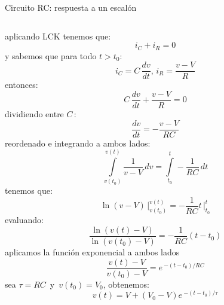 \documentclass[aspectratio=169]{beamer}
\begin{document}
\begin{frame}{Circuito RC: respuesta a un escalón}
\begin{columns}[onlytextwidth]
\begin{column}{0.5\textwidth}
            {
            {aplicando LCK tenemos que:
            \begin{equation*}
                i_C + i_R = 0
            \end{equation*}
            }
            {y sabemos que para todo $t>t_0$: 
            \begin{equation*}
                i_C = C\,\dfrac{dv}{dt},\, i_R=\dfrac{v-V}{R}
            \end{equation*}
            }
            {entonces:
            \begin{equation*}
                C\,\dfrac{dv}{dt} + \dfrac{v-V}{R} = 0
            \end{equation*}
            }
        }
            {
            {dividiendo entre $C\,$:
            \begin{equation*}
                \dfrac{dv}{dt} = -\dfrac{v-V}{RC}
            \end{equation*}
            }
            {reordenado e integrando a ambos lados:
            \begin{equation*}
                \int\limits_{v(t_0)}^{v(t)}\dfrac{1}{v-V}\,dv = \int\limits_{t_0}^{t}-\frac{1}{RC}\,dt
            \end{equation*}
            }
        }
            {
            {tenemos que:
            \begin{equation*}
                \ln(v-V)\,\bigg|_{v(t_0)}^{v(t)} = -\frac{1}{RC}t\,\bigg|_{t_0}^{t}
            \end{equation*}
            }
            {evaluando:
            \begin{equation*}
                \dfrac{\ln(v(t)-V)}{\ln (v(t_0)-V)} = -\frac{1}{RC}(t - t_0)
            \end{equation*}
            }
        }
            {
            {aplicamos la función exponencial a ambos lados
            \begin{equation*}
                \dfrac{v(t)-V}{v(t_0)-V} = e\,^{-(t - t_0)/RC}
            \end{equation*}
            }
            {sea $\tau=RC\,$ y $\,v(t_0) = V_0$, obtenemos:
            \begin{equation*}
                v(t)=V + (V_0-V)e\,^{-(t - t_0)/ \tau}
            \end{equation*}
            }
        }
            {
            {\begin{equation*}

\end{equation*}}}
\end{column}
\end{columns}
\end{frame}
\end{document}
